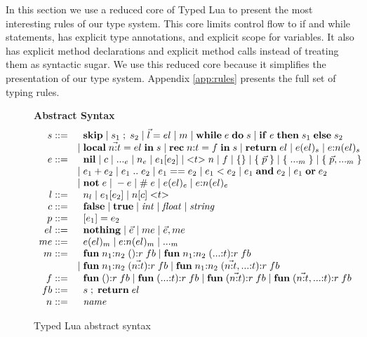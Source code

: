 In this section we use a reduced core of Typed Lua to present the
most interesting rules of our type system.
This core limits control flow to if and while statements,
has explicit type annotations, and explicit scope for variables.
It also has explicit method declarations and explicit method calls
instead of treating them as syntactic sugar.
We use this reduced core because it simplifies the presentation
of our type system.
Appendix \ref{app:rules} presents the full set of typing rules.

\begin{figure}[!ht]
\textbf{Abstract Syntax}\\
\dstart
$$
\begin{array}{rl}
s ::= & \;\; \mathbf{skip} \; | \;
s_{1} \; ; \; s_{2} \; | \;
\vec{l} = el \; | \;
m \; | \;
\mathbf{while} \; e \; \mathbf{do} \; s \; | \;
\mathbf{if} \; e \; \mathbf{then} \; s_{1} \; \mathbf{else} \; s_{2}\\
& | \; \mathbf{local} \; \vec{n{:}t} = el \; \mathbf{in} \; s \; | \;
\mathbf{rec} \; n{:}t = f \; \mathbf{in} \; s \; | \;
\mathbf{return} \; el \; | \;
e(el)_{s} \; | \;
e{:}n(el)_{s}\\
e ::= & \;\; \mathbf{nil} \; | \;
c \; | \;
{...}_{e} \; | \;
n_{e} \; | \;
e_{1}[e_{2}] \; | \;
{<}t{>} \; n \; | \;
f \; | \;
\{ \} \; | \;
\{ \; \vec{p} \; \} \; | \;
\{ \; {...}_{m} \; \} \; | \;
\{ \; \vec{p},{...}_{m} \; \}\\
& | \; e_{1} + e_{2} \; | \;
e_{1} \; {..} \; e_{2} \; | \;
e_{1} == e_{2} \; | \;
e_{1} < e_{2} \; | \;
e_{1} \; \mathbf{and} \; e_{2} \; | \;
e_{1} \; \mathbf{or} \; e_{2} \\
& | \; \mathbf{not} \; e \; | \;
- e \; | \;
\# \; e \; | \;
e(el)_{e} \; | \;
e{:}n(el)_{e}\\
l ::= & \;\; n_{l} \; | \;
e_{1}[e_{2}] \; | \;
n[c] \; {<}t{>}\\
c ::= & \;\; \mathbf{false} \; | \;
\mathbf{true} \; | \;
{\it int} \; | \;
{\it float} \; | \;
{\it string}\\
p ::= & \;\; [e_{1}] = e_{2}\\
el ::= & \;\; \mathbf{nothing} \; | \;
\vec{e} \; | \;
me \; | \;
\vec{e}, me\\
me ::= & \;\; e(el)_{m} \; | \;
e{:}n(el)_{m} \; | \;
{...}_{m}\\
m ::= & \;\; \mathbf{fun} \; n_{1}{:}n_{2} \; (){:}r \; fb \; | \;
\mathbf{fun} \; n_{1}{:}n_{2} \; ({...}{:}t){:}r \; fb\\
& | \; \mathbf{fun} \; n_{1}{:}n_{2} \; (\vec{n{:}t}){:}r \; fb \; | \;
\mathbf{fun} \; n_{1}{:}n_{2} \; (\vec{n{:}t},{...}{:}t){:}r \; fb\\
f ::= & \;\; \mathbf{fun} \; (){:}r \; fb \; | \;
\mathbf{fun} \; ({...}{:}t){:}r \; fb \; | \;
\mathbf{fun} \; (\vec{n{:}t}){:}r \; fb \; | \;
\mathbf{fun} \; (\vec{n{:}t},{...}{:}t){:}r \; fb\\
fb ::= & \;\; s \;;\; \mathbf{return} \; el\\
n ::= & \;\; {\it name}\\
\end{array}
$$
\dend
\caption{Typed Lua abstract syntax}
\label{fig:syntax}
\end{figure}

